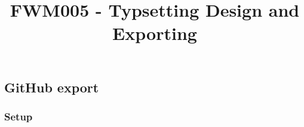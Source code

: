 \documentclass{article}
\begin{document}
\title{FWM005 - Typsetting Design and Exporting}

\maketitle


\subsection{GitHub export}\label{H9847832}



\subsubsection{Setup}\label{H9144388}
\end{document}
